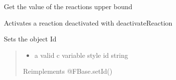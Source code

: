 \documentclass[letterpaper,10pt,english]{sphinxmanual}
\begin{document}
\begin{fulllineitems}
\begin{fulllineitems}
\end{fulllineitems}


\begin{fulllineitems}
\label{\detokenize{modules_doc:cbmpy.CBModel.ReactionNew.getUpperBound}}
\pysigstartsignatures
{}
\pysigstopsignatures
\sphinxAtStartPar
Get the value of the reactions upper bound

\end{fulllineitems}


\begin{fulllineitems}
\label{\detokenize{modules_doc:cbmpy.CBModel.ReactionNew.reactivateReaction}}
\pysigstartsignatures
{}
\pysigstopsignatures
\sphinxAtStartPar
Activates a reaction deactivated with deactivateReaction

\end{fulllineitems}


\begin{fulllineitems}
\label{\detokenize{modules_doc:cbmpy.CBModel.ReactionNew.setId}}
\pysigstartsignatures
{}
\pysigstopsignatures
\sphinxAtStartPar
Sets the object Id
\begin{quote}
\begin{itemize}
\item {} 
\sphinxAtStartPar
{} a valid c variable style id string

\end{itemize}

\sphinxAtStartPar
Reimplements @FBase.setId()
\end{quote}

\end{fulllineitems}



\end{fulllineitems}
\end{document}
